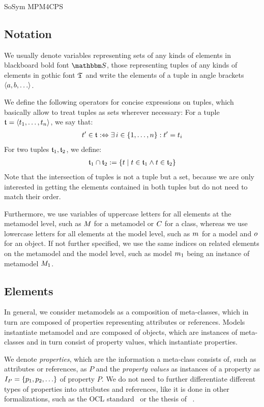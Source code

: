 \begin{copiedFrom}{SoSym MPM4CPS}
\subsection{Notation}

We usually denote variables representing sets of any kinds of elements in blackboard bold font $\set{S}{}$, those representing tuples of any kinds of elements in gothic font $\mathfrak{T}_{}$ and write the elements of a tuple in angle brackets $\tupled{a, b, \dots}$.

We define the following operators for concise expressions on tuples, which basically allow to treat tuples as sets wherever necessary:
For a tuple $\mathfrak{t}_{} = \langle t_1, \dots, t_n \rangle$, we say that:
\begin{align*}
    \formulaskip &
    t' \in \tuple{t}{} \equivalentperdefinition \exists i \in \setted{1, \dots, n} : t' = t_i
\end{align*}
For two tuples $\mathfrak{t}_{1}, \mathfrak{t}_{2}$, we define:
\begin{align*}
    \hspace{1em} &
    \mathfrak{t}_{1} \cap \mathfrak{t}_{2} := \{ t \mid t \in \mathfrak{t}_{1} \land t \in \mathfrak{t}_{2} \}
\end{align*}
Note that the intersection of tuples is not a tuple but a set, because we are only interested in getting the elements contained in both tuples but do not need to match their order.

Furthermore, we use variables of uppercase letters for all elements at the metamodel level, such as $M_{}$ for a metamodel or $C_{}$ for a class, whereas we use lowercase letters for all elements at the model level, such as $m_{}$ for a model and $o_{}$ for an object.
If not further specified, we use the same indices on related elements on the metamodel and the model level, such as model $m_{1}$ being an instance of metamodel $M_{1}$.

\subsection{Elements}

In general, we consider metamodels as a composition of meta-classes, which in turn are composed of properties representing attributes or references.
Models instantiate metamodel and are composed of objects, which are instances of meta-classes and in turn consist of property values, which instantiate properties.

We denote \emph{properties}, which are the information a meta-class consists of, such as attributes or references, as $P$ and the \emph{property values} as instances of a property as $\metamodelinstances{P} = \setted{p_1, p_2, \dots}$ of property $P$. 
We do not need to further differentiate different types of properties into attributes and references, like it is done in other formalizations, such as the OCL standard~\cite[A.1]{ocl} or the thesis of \citeauthor{kramer2017a}~\cite[2.3.2]{kramer2017a}.


\end{copiedFrom}
